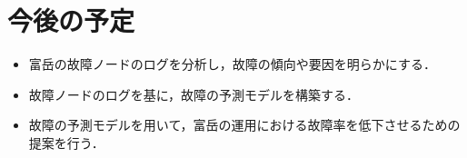 \documentclass[a4paper,11pt,twocolumn]{jsarticle}
\begin{document}
\section{今後の予定}

\begin{itemize}
  \item 富岳の故障ノードのログを分析し，故障の傾向や要因を明らかにする．
  \item 故障ノードのログを基に，故障の予測モデルを構築する．
  \item 故障の予測モデルを用いて，富岳の運用における故障率を低下させるための提案を行う．
\end{itemize}



\end{document}
